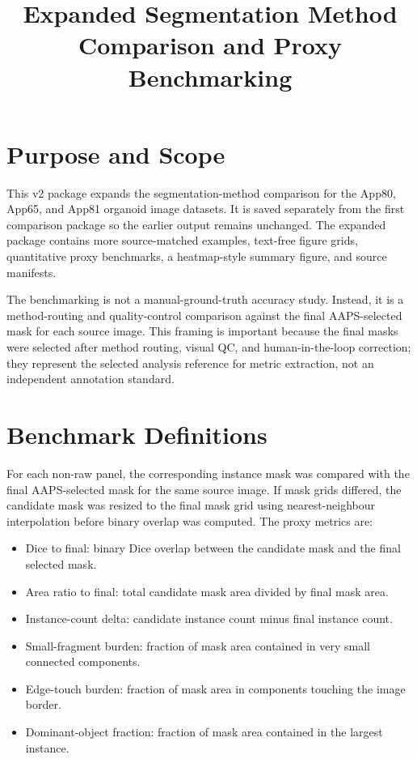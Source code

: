 \documentclass[11pt]{article}
\title{Expanded Segmentation Method Comparison and Proxy Benchmarking}
\author{}
\date{}
\begin{document}
\maketitle

\section*{Purpose and Scope}

This v2 package expands the segmentation-method comparison for the App80,
App65, and App81 organoid image datasets. It is saved separately from the first
comparison package so the earlier output remains unchanged. The expanded package
contains more source-matched examples, text-free figure grids, quantitative proxy
benchmarks, a heatmap-style summary figure, and source manifests.

The benchmarking is not a manual-ground-truth accuracy study. Instead, it is a
method-routing and quality-control comparison against the final AAPS-selected
mask for each source image. This framing is important because the final masks
were selected after method routing, visual QC, and human-in-the-loop correction;
they represent the selected analysis reference for metric extraction, not an
independent annotation standard.

\section*{Benchmark Definitions}

For each non-raw panel, the corresponding instance mask was compared with the
final AAPS-selected mask for the same source image. If mask grids differed, the
candidate mask was resized to the final mask grid using nearest-neighbour
interpolation before binary overlap was computed. The proxy metrics are:

\begin{itemize}
\item Dice to final: binary Dice overlap between the candidate mask and the final selected mask.
\item Area ratio to final: total candidate mask area divided by final mask area.
\item Instance-count delta: candidate instance count minus final instance count.
\item Small-fragment burden: fraction of mask area contained in very small connected components.
\item Edge-touch burden: fraction of mask area in components touching the image border.
\item Dominant-object fraction: fraction of mask area contained in the largest instance.
\end{itemize}
\end{document}
